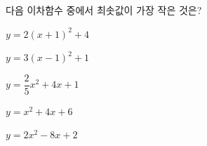 다음 이차함수 중에서 최솟값이 가장 작은 것은?
\begin{choicesii}{\rule[-3ex]{0pt}{8ex}$y=2(x+1)^2+4$}{\rule[-3ex]{0pt}{8ex}$y=3(x-1)^2+1$}{\rule[-3ex]{0pt}{8ex}$y=\dfrac{2}{5}x^2+4x+1$}{\rule[-3ex]{0pt}{8ex}$y=x^2+4x+6$}{\rule[-3ex]{0pt}{8ex}$y=2x^2-8x+2$}\end{choicesii}
